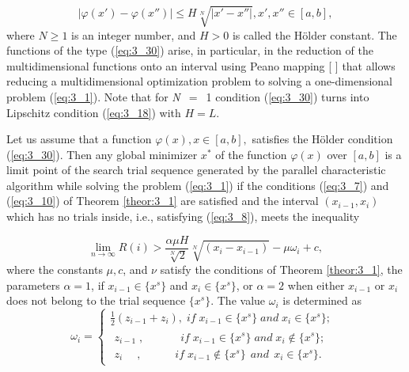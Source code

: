 	\begin{equation}
	\label{eq:3_30}
	|\varphi (x')-\varphi (x'')|\le H\sqrt[{N}]{|x'-x''|} ,x',x''\in [a,b],
	\end{equation}
	where $N\ge 1$ is an integer number, and $H>0$ is called the H\"{o}lder constant. The functions of the type  (\ref{eq:3_30}) arise, in particular, in the reduction of the multidimensional functions onto an interval using Peano mapping [    ] that allows reducing a multidimensional optimization problem to solving a one-dimensional problem  (\ref{eq:3_1}). Note that for \textit{N~}$=$~1 condition  (\ref{eq:3_30}) turns into Lipschitz condition  (\ref{eq:3_18}) with $H=L$.
	
	\begin{theorem}
	\label{theor:3_4}
		Let us assume that a function $\varphi (x),x\in [a, b],$ satisfies the H\"{o}lder condition  (\ref{eq:3_30}). Then any global minimizer $x^{*} $ of the function $\varphi (x)$ over $[a, b]$ is a limit point of the search trial sequence generated by the parallel characteristic algorithm while solving the problem  (\ref{eq:3_1}) if the conditions  (\ref{eq:3_7}) and  (\ref{eq:3_10}) of Theorem \ref{theor:3_1} are satisfied and the interval $(x_{i-1} ,x_{i} )$ which has no trials inside, i.e., satisfying   (\ref{eq:3_8}), meets the inequality 
	
	\begin{equation}
	\label{eq:3_31}
	\mathop{\lim }\limits_{n\to \infty } R(i)>\frac{\alpha \mu H}{\sqrt[{N}]{2} } \sqrt[{N}]{(x_{i} -x_{i-1} )} -\mu \omega _{i} +c,
	\end{equation}
	where the constants $\mu, c$, and $\nu$ satisfy the conditions of Theorem \ref{theor:3_1}, the parameters $\alpha =1$,  if $x_{i-1} \in \{ x^s \} $ and $ x_i \in \{ x^s \} $, or $\alpha =2$ when either $x_{i-1} $ or $x_i $ does not belong to the trial sequence $\{ x^s \} $. The value  $\omega _i $ is determined as 
	\begin{equation} 
	\label{eq:3_32} 
	\omega _{i} =\left\{
	\begin{array}{c}
	{\frac{1}{2} (z_{i-1} + z_i ),\; if \; x_{i-1} \in \{ x^s \} \; and \; x_i \in \{ x^s \} ;} \\ 
	{ \begin{array}{l} 
		{z_{i-1} \; ,\; \quad \quad \quad if \; x_{i-1} \in \{ x^s \} \; and \; x_i \notin \{ x^s \} ;} \\ 
		{z_i \quad \; , \quad \quad \quad if\; x_{i-1} \notin \{ x^s \} \, \; and\; \, x_i \in \{ x^s \} .}
	  \end{array}}
 	\end{array}\right. \; \,  
	\end{equation} 
	\end{theorem}


